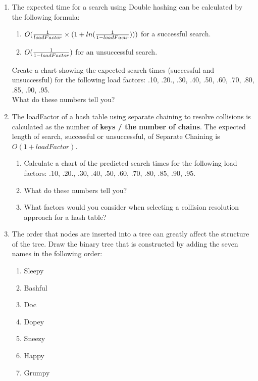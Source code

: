 \documentclass{article}
\begin{document}
\begin{enumerate}
	\vspace{4cm}
	\item The expected time for a search using Double hashing can be calculated by the following formula:
		\begin{enumerate}[label=\roman*.]
			\item \(O({1 \over loadFactor} \times (1 + ln({1 \over {1 - loadFactr}})))\) for a successful search.
			\item \(O({ 1 \over {1 - loadFactor}})\) for an unsuccessful search.
		\end{enumerate}
		Create a chart showing the expected search times (successful and unsuccessful) for the following load factors: .10, .20., .30, .40, .50, .60, .70, .80, .85, .90, .95. \\
		What do these numbers tell you?
	\vspace{2cm}
	\item The loadFactor of a hash table using separate chaining to resolve collisions is calculated as the number of \textbf{keys / the number of chains}. The expected length of search, successful or unsuccessful, of Separate Chaining is \(O(1 + loadFactor)\).
		\begin{enumerate}[label=\alph*.]
			\item Calculate a chart of the predicted search times for the following load factors: .10, .20., .30, .40, .50, .60, .70, .80, .85, .90, .95.
			\vspace{2cm}
			\item What do these numbers tell you?
			\newpage
			\item What factors would you consider when selecting a collision resolution approach for a hash table?
			\vspace{2cm}
		\end{enumerate}
	\item The order that nodes are inserted into a tree can greatly affect the structure of the tree. Draw the binary tree that is constructed by adding the seven names in the following order:
		\begin{enumerate}[label=\arabic*.]
			\item Sleepy
			\item Bashful
			\item Doc
			\item Dopey
			\item Sneezy
			\item Happy
			\item Grumpy
		\end{enumerate}

\end{enumerate}
\end{document}
